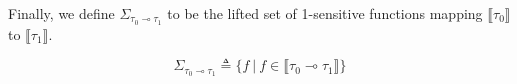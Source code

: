 Finally, we define $\Sigma_{\tau_0 \multimap \tau_1}$ to be the lifted set of
1-sensitive functions mapping $\llbracket \tau_0 \rrbracket$ to $\llbracket
\tau_1 \rrbracket$.

\begin{definition}
  \begin{equation}
    \Sigma_{\tau_0 \multimap \tau_1} \triangleq \{ f \ | \ f \in \llbracket \tau_0
    \multimap \tau_1 \rrbracket \}
  \end{equation}
\end{definition}
